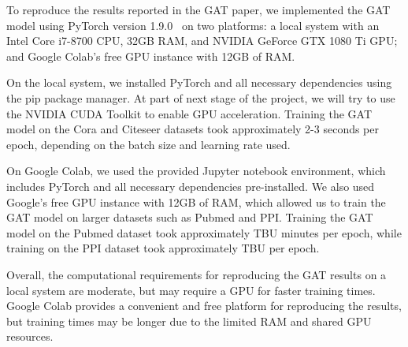 To reproduce the results reported in the GAT paper, we implemented the GAT model using PyTorch version 1.9.0~\cite{paszke2019pytorch} on two platforms: a local system with an Intel Core i7-8700 CPU, 32GB RAM, and NVIDIA GeForce GTX 1080 Ti GPU; and Google Colab's free GPU instance with 12GB of RAM.

On the local system, we installed PyTorch and all necessary dependencies using the pip package manager.
At part of next stage of the project, we will try to use the NVIDIA CUDA Toolkit to enable GPU acceleration.
Training the GAT model on the Cora and Citeseer datasets took approximately 2-3 seconds per epoch, depending on the
batch size and learning rate used.

On Google Colab, we used the provided Jupyter notebook environment, which includes PyTorch and all necessary dependencies pre-installed.
We also used Google's free GPU instance with 12GB of RAM, which allowed us to train the GAT model on larger datasets such as Pubmed and PPI.
Training the GAT model on the Pubmed dataset took approximately TBU minutes per epoch, while training on the PPI
dataset took approximately TBU per epoch.

Overall, the computational requirements for reproducing the GAT results on a local system are moderate, but may require a GPU for faster training times.
Google Colab provides a convenient and free platform for reproducing the results, but training times may be longer due to the limited RAM and shared GPU resources.